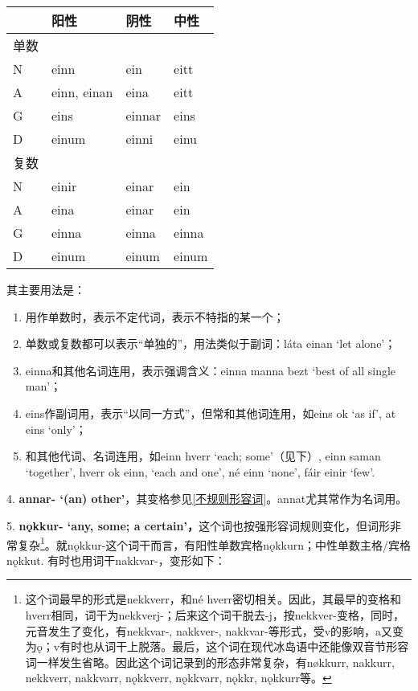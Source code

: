 \begin{longtable}{llll}
  \toprule
       & 阳性        & 阴性   & 中性  \\
  \midrule
  \endhead
  \bottomrule
  \endfoot
  单数 &             &        &       \\
  N    & einn        & ein    & eitt  \\
  A    & einn, einan & eina   & eitt  \\
  G    & eins        & einnar & eins  \\
  D    & einum       & einni  & einu  \\
  复数 &             &        &       \\
  N    & einir       & einar  & ein   \\
  A    & eina        & einar  & ein   \\
  G    & einna       & einna  & einna \\
  D    & einum       & einum  & einum \\
\end{longtable}

其主要用法是：

\begin{enumerate}
  \def\labelenumi{\Alph{enumi}.}
  \item
        用作单数时，表示不定代词，表示不特指的某一个；
  \item
        单数或复数都可以表示``单独的''，用法类似于副词：láta einan `let
        alone'；
  \item
        einna和其他名词连用，表示强调含义：einna manna bezt `best of all
        single man'；
  \item
        eins作副词用，表示``以同一方式''，但常和其他词连用，如eins ok `as if',
        at eins `only'；
  \item
        和其他代词、名词连用，如einn hverr `each; some‌'（见下）, einn saman
        `together', hverr ok einn, `each and one', né einn `none', fáir einir
        `few'.
\end{enumerate}

4. \textbf{annar- `(an)
  other‌'}，其变格参见\ref{不规则形容词}。annat尤其常作为名词用。

5. \textbf{nǫkkur- `any, some; a
  certain‌'，}这个词也按强形容词规则变化，但词形非常复杂\footnote{这个词最早的形式是nekkverr，和né
  hverr密切相关。因此，其最早的变格和hverr相同，词干为nekkverj-；后来这个词干脱去-j，按nekkver-变格，同时，元音发生了变化，有nekkvar-,
  nakkver-,
  nakkvar-等形式，受v的影响，a又变为ǫ；v有时也从词干上脱落。最后，这个词在现代冰岛语中还能像双音节形容词一样发生省略。因此这个词记录到的形态非常复杂，有nøkkurr,
  nakkurr, nekkverr, nakkvarr, nǫkkverr, nǫkkvarr, nǫkkr, nǫkkurr等。}。就nǫkkur-这个词干而言，有阳性单数宾格nǫkkurn；中性单数主格/宾格nǫkkut.
有时也用词干nakkvar-，变形如下：

